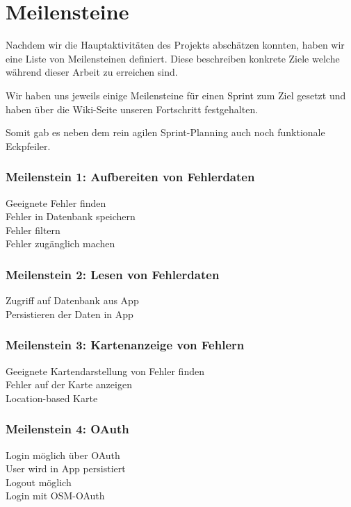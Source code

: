 \section{Meilensteine}
\label{meilensteine}

Nachdem wir die Hauptaktivitäten des Projekts abschätzen konnten, haben wir eine Liste von Meilensteinen definiert.
Diese beschreiben konkrete Ziele welche während dieser Arbeit zu erreichen sind.

Wir haben uns jeweils einige Meilensteine für einen Sprint zum Ziel gesetzt und haben über die Wiki-Seite unseren Fortschritt festgehalten.

Somit gab es neben dem rein agilen Sprint-Planning auch noch funktionale Eckpfeiler.

\subsubsection{Meilenstein 1: Aufbereiten von Fehlerdaten}
\tick Geeignete Fehler finden \\
\tick Fehler in Datenbank speichern \\
\tick Fehler filtern \\
\tick Fehler zugänglich machen

\subsubsection{Meilenstein 2: Lesen von Fehlerdaten}

\tick Zugriff auf Datenbank aus App \\
\tick Persistieren der Daten in App

\subsubsection{Meilenstein 3: Kartenanzeige von Fehlern}

\tick Geeignete Kartendarstellung von Fehler finden \\
\tick Fehler auf der Karte anzeigen \\
\tick Location-based Karte

\subsubsection{Meilenstein 4: OAuth}

\tick Login möglich über OAuth \\
\tick User wird in App persistiert \\
\tick Logout möglich \\
\tick Login mit OSM-OAuth

